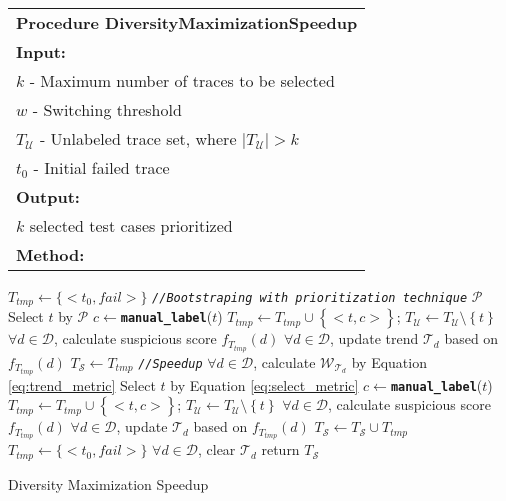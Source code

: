 
\begin{algorithm}%
{
\centering
 
\hspace{-0.0cm}\parbox[l]{3.2in} {
{%
\begin {tabular}[t]{l}
\textbf{Procedure DiversityMaximizationSpeedup}\\
\textbf{Input:}\\
\quad $k$ - Maximum number of traces to be selected\\
\quad $w$ - Switching threshold\\
\quad $T_\mathcal{U}$ - Unlabeled trace set, where $|T_\mathcal{U}|> k$\\
\quad $t_0$ - Initial failed trace\\
\textbf{Output:}\\
\quad $k$ selected test cases prioritized\\
\textbf{Method:}\\
\end{tabular}
\begin{algorithmic}[1]
	\STATE $T_{tmp} \leftarrow \{<t_0, fail>\}$
	\STATE \textit{\texttt{//Bootstraping with prioritization technique}} $\mathcal{P}$
		\STATE Select $t$ by $\mathcal{P}$
		\STATE $c \leftarrow$\texttt{\textbf{manual\_label}}($t$)
		\STATE $T_{tmp} \leftarrow T_{tmp} \cup \left\{\right.<t, c>\left.\right\}$; $T_\mathcal{U}\leftarrow T_\mathcal{U} \setminus \left\{t\right\}$
		\STATE $\forall d \in \mathcal{D}$, calculate suspicious score $f_{T_{tmp}}(d)$
		\STATE $\forall d \in \mathcal{D}$, update trend $\mathcal{T}_{d}$ based on $f_{T_{tmp}}(d)$
	\ENDWHILE
	\STATE $T_\mathcal{S} \leftarrow T_{tmp}$
	\STATE \textit{\texttt{//Speedup}}
		\STATE $\forall d \in \mathcal{D}$, calculate $\mathcal{W}_{\mathcal{T}_{d}}$ by Equation \ref{eq:trend_metric}
		\STATE Select $t$ by Equation \ref{eq:select_metric}
		\STATE $c \leftarrow$\texttt{\textbf{manual\_label}}($t$)
		\STATE $T_{tmp} \leftarrow T_{tmp} \cup \left\{\right.<t, c>\left.\right\}$; $T_\mathcal{U}\leftarrow T_\mathcal{U} \setminus \left\{t\right\}$
		\STATE $\forall d \in \mathcal{D}$, calculate suspicious score $f_{T_{tmp}}(d)$
		\STATE $\forall d \in \mathcal{D}$, update $\mathcal{T}_{d}$ based on $f_{T_{tmp}}(d)$
		\STATE $T_\mathcal{S} \leftarrow T_\mathcal{S} \cup T_{tmp}$
			\STATE $T_{tmp} \leftarrow \{<t_0, fail>\}$
			\STATE $\forall d \in \mathcal{D}$, clear $\mathcal{T}_{d}$
		\ENDIF
	\ENDWHILE
	\STATE return $T_\mathcal{S}$
\end{algorithmic}
}
}
}
\caption{\small{Diversity Maximization Speedup}} \label{algo:DMS}
\end{algorithm}









